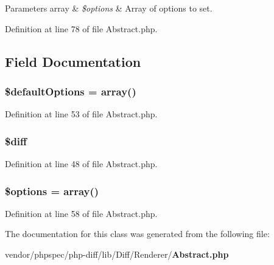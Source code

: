 \begin{DoxyParams}[1]{Parameters}
array & {\em \$options} & Array of options to set. \\
\hline
\end{DoxyParams}


Definition at line 78 of file Abstract.\+php.



\subsection{Field Documentation}
\subsubsection[{\$default\+Options}]{\setlength{\rightskip}{0pt plus 5cm}\$default\+Options = array()\hspace{0.3cm}{\ttfamily [protected]}}\label{class_diff___renderer___abstract_a5b060dd94ee5476aa989c591f9aca43c}


Definition at line 53 of file Abstract.\+php.

\subsubsection[{\$diff}]{\setlength{\rightskip}{0pt plus 5cm}\$diff}\label{class_diff___renderer___abstract_a054557295caacf1b6e4a2b8809418221}


Definition at line 48 of file Abstract.\+php.

\subsubsection[{\$options}]{\setlength{\rightskip}{0pt plus 5cm}\${\bf options} = array()\hspace{0.3cm}{\ttfamily [protected]}}\label{class_diff___renderer___abstract_a011800c63ece4cbbfa77136a20607023}


Definition at line 58 of file Abstract.\+php.



The documentation for this class was generated from the following file\+:\begin{DoxyCompactItemize}
\item 
vendor/phpspec/php-\/diff/lib/\+Diff/\+Renderer/{\bf Abstract.\+php}\end{DoxyCompactItemize}
